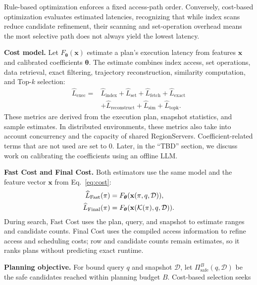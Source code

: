 Rule-based optimization enforces a fixed access-path order. 
Conversely, cost-based optimization evaluates estimated latencies, recognizing that while index scans reduce candidate refinement, their scanning and set-operation overhead means the most selective path does not always yield the lowest latency.

\noindent\textbf{Cost model.}
Let $F_{\boldsymbol{\theta}}(\mathbf{x})$ estimate a plan's execution latency from features $\mathbf{x}$ and calibrated coefficients $\boldsymbol{\theta}$.
  The estimate combines index access, set operations, data retrieval, exact filtering, trajectory reconstruction, similarity computation, and Top-$k$ selection:
\begin{equation}\label{eq:cost}
\begin{aligned}
\widehat{L}_{\mathrm{exec}}
={}&\widehat{L}_{\mathrm{index}}+\widehat{L}_{\mathrm{set}}
+\widehat{L}_{\mathrm{fetch}}+\widehat{L}_{\mathrm{exact}}\\
&+\widehat{L}_{\mathrm{reconstruct}}+\widehat{L}_{\mathrm{sim}}
+\widehat{L}_{\mathrm{topk}}.
\end{aligned}
\end{equation}
These metrics are derived from the execution plan, snapshot statistics, and sample estimates. In distributed environments, these metrics also take into account concurrency and the capacity of shared RegionServers.
Coefficient-related terms that are not used are set to 0.
Later, in the “TBD” section, we discuss work on calibrating the coefficients using an offline LLM.

\noindent\textbf{Fast Cost and Final Cost.}
Both estimators use the same model and the feature vector $\mathbf{x}$ from Eq.~\eqref{eq:cost}:
\begin{equation}\label{eq:fast-final}
\begin{aligned}
\widehat{L}_{\mathrm{Fast}}(\pi)&=F_{\boldsymbol{\theta}}(\mathbf{x}(\pi,q,\mathcal{D})),\\
\widehat{L}_{\mathrm{Final}}(\pi)&=F_{\boldsymbol{\theta}}(\mathbf{x}(\mathcal{K}(\pi),q,\mathcal{D})).
\end{aligned}
\end{equation}
During search, Fast Cost uses the plan, query, and snapshot to estimate ranges and candidate counts. Final Cost uses the compiled access information to refine access and scheduling costs; row and candidate counts remain estimates, so it ranks plans without predicting exact runtime.

\noindent\textbf{Planning objective.}
For bound query $q$ and snapshot $\mathcal{D}$, let $\Pi_{\mathrm{safe}}^{B}(q,\mathcal{D})$ be the safe candidates reached within planning budget $B$.
  Cost-based selection seeks

